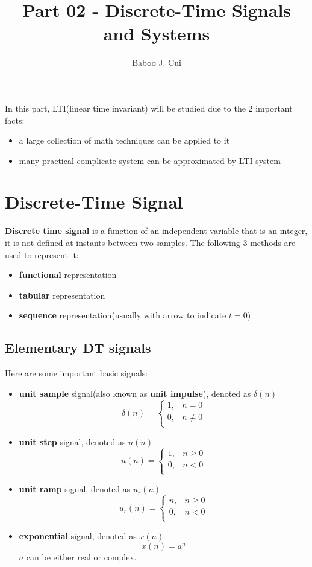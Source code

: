 \documentclass[10pt,a4paper,oneside]{article}
\author{Baboo J. Cui}
\title{Part 02 - Discrete-Time Signals and Systems}
\begin{document}
\maketitle
\tableofcontents

\newpage
In this part, LTI(linear time invariant) will be studied due to the $2$ important facts:
\begin{itemize}
	\item a large collection of math techniques can be applied to it
	\item many practical complicate system can be approximated by LTI system
\end{itemize}

\section{Discrete-Time Signal}
\textbf{Discrete time signal} is a function of an independent variable that is an integer, it is not defined at instants between two samples. The following $3$ methods are used to represent it:
\begin{itemize}
	\item \textbf{functional} representation
	\item \textbf{tabular} representation
	\item \textbf{sequence} representation(usually with arrow to indicate $t = 0$)
\end{itemize}

\subsection{Elementary DT signals}
Here are some important basic signals:
\begin{itemize}
	\item \textbf{unit sample} signal(also known as \textbf{unit impulse}), denoted as $\delta(n)$
	\[
	\delta(n) = \left\{
	\begin{array}{ll}
	1, & n = 0 \\
	0, & n \neq 0\\
	\end{array}\right.
	\]
	\item \textbf{unit step} signal, denoted as $u(n)$
	\[
	u(n) = \left\{
	\begin{array}{ll}
	1, & n \geq 0 \\
	0, & n < 0\\
	\end{array}\right.
	\]
	\item \textbf{unit ramp} signal, denoted as $u_r(n)$
	\[
	u_r(n) = \left\{
	\begin{array}{ll}
	n, & n \geq 0 \\
	0, & n < 0\\
	\end{array}\right.
	\]
	\item \textbf{exponential} signal, denoted as $x(n)$
	\[
	x(n) = a^n
	\]
	$a$ can be either real or complex.
\end{itemize}
\end{document}
